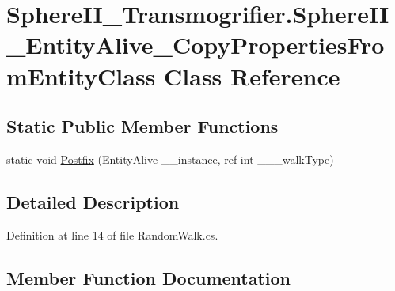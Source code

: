 \hypertarget{class_sphere_i_i___transmogrifier_1_1_sphere_i_i___entity_alive___copy_properties_from_entity_class}{}\section{Sphere\+I\+I\+\_\+\+Transmogrifier.\+Sphere\+I\+I\+\_\+\+Entity\+Alive\+\_\+\+Copy\+Properties\+From\+Entity\+Class Class Reference}
\label{class_sphere_i_i___transmogrifier_1_1_sphere_i_i___entity_alive___copy_properties_from_entity_class}
\subsection*{Static Public Member Functions}
\begin{DoxyCompactItemize}
\item 
static void \mbox{\hyperlink{class_sphere_i_i___transmogrifier_1_1_sphere_i_i___entity_alive___copy_properties_from_entity_class_a01989f0df5ac4c81e0d8aa3095d23f22}{Postfix}} (Entity\+Alive \+\_\+\+\_\+instance, ref int \+\_\+\+\_\+\+\_\+walk\+Type)
\end{DoxyCompactItemize}


\subsection{Detailed Description}


Definition at line 14 of file Random\+Walk.\+cs.



\subsection{Member Function Documentation}
\mbox{\label{class_sphere_i_i___transmogrifier_1_1_sphere_i_i___entity_alive___copy_properties_from_entity_class_a01989f0df5ac4c81e0d8aa3095d23f22}} 
